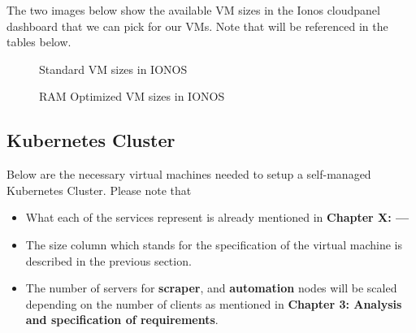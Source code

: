 The two images below show the available VM sizes in the Ionos cloudpanel dashboard that we can pick for our VMs.
Note that will be referenced in the tables below.
\begin{figure}[H]
    \centering
    \caption{Standard VM sizes in IONOS}
    \label{fig:standard-vm-sizes}
\end{figure}
\begin{figure}[H]
    \centering
    \caption{RAM Optimized VM sizes in IONOS}
    \label{fig:ram-optimized-vm-sizes}
\end{figure}

\subsection{Kubernetes Cluster}
Below are the necessary virtual machines needed to setup a self-managed Kubernetes Cluster.
Please note that
\begin{itemize}
    \item What each of the services represent is already mentioned in \textbf{Chapter X: ---}
    \item The size column which stands for the specification of the virtual machine is described in the previous section.
    \item The number of servers for \textbf{scraper}, and \textbf{automation} nodes will be scaled depending on the number of clients as mentioned in \textbf{Chapter 3: Analysis and specification of requirements}.
\end{itemize}

